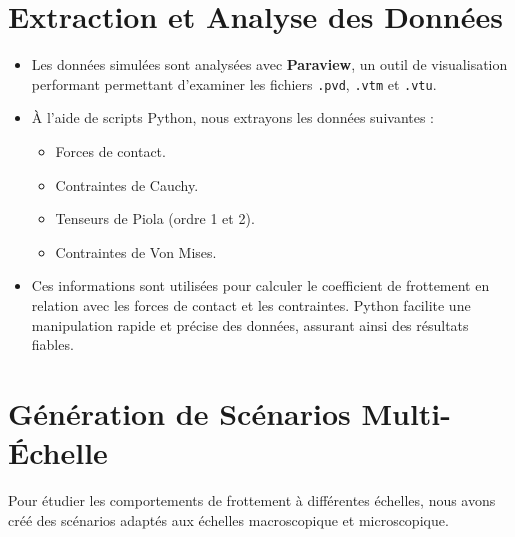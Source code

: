 \section{Extraction et Analyse des Données}
\begin{itemize}
    \item Les données simulées sont analysées avec \textbf{Paraview}, un outil de visualisation performant permettant d'examiner les fichiers \texttt{.pvd}, \texttt{.vtm} et \texttt{.vtu}.
    \item À l'aide de scripts Python, nous extrayons les données suivantes :
    \begin{itemize}
        \item Forces de contact.
        \item Contraintes de Cauchy.
        \item Tenseurs de Piola (ordre 1 et 2).
        \item Contraintes de Von Mises.
    \end{itemize}
    \item Ces informations sont utilisées pour calculer le coefficient de frottement en relation avec les forces de contact et les contraintes. Python facilite une manipulation rapide et précise des données, assurant ainsi des résultats fiables.
\end{itemize}

\section{Génération de Scénarios Multi-Échelle}
Pour étudier les comportements de frottement à différentes échelles, nous avons créé des scénarios adaptés aux échelles macroscopique et microscopique.

